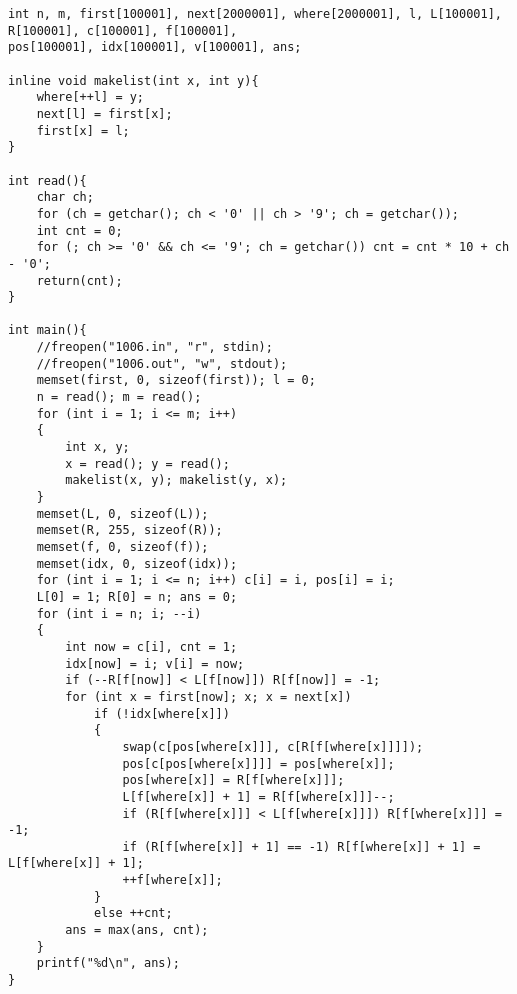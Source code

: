 \begin{lstlisting}
int n, m, first[100001], next[2000001], where[2000001], l, L[100001], R[100001], c[100001], f[100001],
pos[100001], idx[100001], v[100001], ans;

inline void makelist(int x, int y){
    where[++l] = y;
    next[l] = first[x];
    first[x] = l;
}

int read(){
    char ch;
    for (ch = getchar(); ch < '0' || ch > '9'; ch = getchar());
    int cnt = 0;
    for (; ch >= '0' && ch <= '9'; ch = getchar()) cnt = cnt * 10 + ch - '0';
    return(cnt);
}

int main(){
    //freopen("1006.in", "r", stdin);
    //freopen("1006.out", "w", stdout);
    memset(first, 0, sizeof(first)); l = 0;
    n = read(); m = read();
    for (int i = 1; i <= m; i++)
    {
        int x, y;
        x = read(); y = read();
        makelist(x, y); makelist(y, x);
    }
    memset(L, 0, sizeof(L));
    memset(R, 255, sizeof(R));
    memset(f, 0, sizeof(f));
    memset(idx, 0, sizeof(idx));
    for (int i = 1; i <= n; i++) c[i] = i, pos[i] = i;
    L[0] = 1; R[0] = n; ans = 0;
    for (int i = n; i; --i)
    {
        int now = c[i], cnt = 1;
        idx[now] = i; v[i] = now;
        if (--R[f[now]] < L[f[now]]) R[f[now]] = -1;
        for (int x = first[now]; x; x = next[x])
            if (!idx[where[x]])
            {
                swap(c[pos[where[x]]], c[R[f[where[x]]]]);
                pos[c[pos[where[x]]]] = pos[where[x]];
                pos[where[x]] = R[f[where[x]]];
                L[f[where[x]] + 1] = R[f[where[x]]]--;
                if (R[f[where[x]]] < L[f[where[x]]]) R[f[where[x]]] = -1;
                if (R[f[where[x]] + 1] == -1) R[f[where[x]] + 1] = L[f[where[x]] + 1];
                ++f[where[x]];
            }
            else ++cnt;
        ans = max(ans, cnt);
    }
    printf("%d\n", ans);
}
\end{lstlisting}
